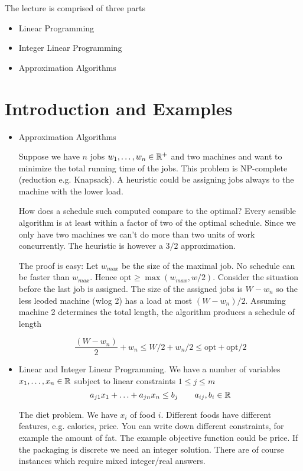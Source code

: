 The lecture is comprised of three parts

\begin{itemize}
\item Linear Programming
\item Integer Linear Programming
\item Approximation Algorithms
\end{itemize}

\section{Introduction and Examples}
\begin{itemize}
\item Approximation Algorithms
\begin{Ex} Suppose we have $n$ jobs ${w}_1,\ldots,{w}_n\in \mathbb{R}^+$ and two machines and want to minimize the total running time of the jobs. This problem is NP-complete (reduction e.g. Knapsack). A heuristic could be assigning jobs always to the machine with the lower load.

How does a schedule such computed compare to the optimal? Every sensible algorithm is at least within a factor of two of the optimal schedule. Since we only have two machines we can't do more than two units of work concurrently. The heuristic is however a $3/2$ approximation.

The proof is easy: Let $w_{max}$ be the size of the maximal job. No schedule can be faster than $w_{max}$. Hence $\mbox{opt} \geq \max (w_{max}, w/2)$. Consider the situation before the last job is assigned. The size of the assigned jobs is $W-w_n$ so the less leoded machine (wlog 2) has a load at most $(W-w_n)/2$. Assuming machine 2 determines the total length, the algorithm produces a schedule of length 

\[\frac{(W-w_n)}{2} + w_n \leq W/2+w_n/2 \leq \mbox{opt} + \mbox{opt}/2\]
\end{Ex}
\item Linear and Integer Linear Programming. We have a number of variables ${x}_1,\ldots,{x}_n\in \mathbb{R}$ subject to linear constraints $1\leq j\leq m$
\[a_{j1}x_1 + \ldots + a_{jn} x_n \leq b_j \qquad a_{ij},b_i \in \mathbb{R}\]

\begin{Ex}{The diet problem.} We have $x_i$ of food $i$. Different foods have different features, e.g. calories, price. You can write down different constraints, for example the amount of fat. The example objective function could be price. If the packaging is discrete we need an integer solution. There are of course instances which require mixed integer/real answers.
\end{Ex}


\end{itemize}

